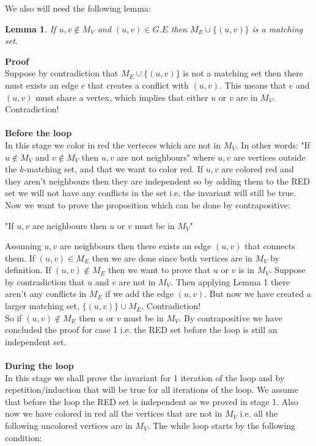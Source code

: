 \documentclass[10pt,a4paper]{article}
\newtheorem{lemma}{Lemma}
\begin{document}
We also will need the following lemma:
\begin{lemma} If $u,v \not \in M_V$ and $(u,v) \in G.E$ then $M_E \cup \{(u,v)\}$ is a matching set.
\end{lemma}
\textbf{Proof}\\
Suppose by contradiction that $M_E \cup \{(u,v)\}$ is not a matching set then there must exists an edge $e$ that creates a conflict with $(u,v)$. This means that $e$ and $(u,v)$ must share a vertex, which implies that either $u$ or $v$ are in $M_V$. Contradiction!\\\\ 
\textbf{Before the loop}\\
In this stage we color in red the verteces which are not in $M_V$. In other words: "If $u \not\in M_V$ and $v \not\in M_V$ then $u,v$ are not neighbours" where $u,v$ are vertices outside the $k$-matching set, and that we want to color red. If $u,v$ are colored red and they aren't neighbours then they are independent so by adding them to the RED set we will not have any conflicts in the set i.e. the invariant will still be true.
Now we want to prove the proposition which can be done by contrapositive:
\begin{center}
"If $u,v$ are neighbours then $u$ or $v$ must be in $M_V$"
\end{center} 
Assuming $u,v$ are neighbours then there exists an edge $(u,v)$ that connects them. 
If $(u,v) \in M_E$ then we are done since both vertices are in $M_V$ by definition. If $(u,v) \not\in M_E$ then we want to prove that $u$ or $v$ is in $M_V$. Suppose by contradiction that $u$ and $v$ are not in $M_V$. Then applying Lemma 1 there aren't any conflicts in $M_E$ if we add the edge $(u,v)$. But now we have created a larger matching set, $\{(u,v)\} \cup M_E$. Contradiction!\\
So if $(u,v) \not\in M_E$ then $u$ or $v$ must be in $M_V$. By contrapositive we have concluded the proof for case 1 i.e. the RED set before the loop is still an independent set. \\\\
\textbf{During the loop}\\
In this stage we shall prove the invariant for 1 iteration of the loop and by repetition/induction that will be true for all iterations of the loop. We assume that before the loop the RED set is independent as we proved in stage 1. Also now we have colored in red all the vertices that are not in $M_V$ i.e. all the following uncolored vertices are in $M_V$. The while loop starts by the following condition: 
\end{document}

